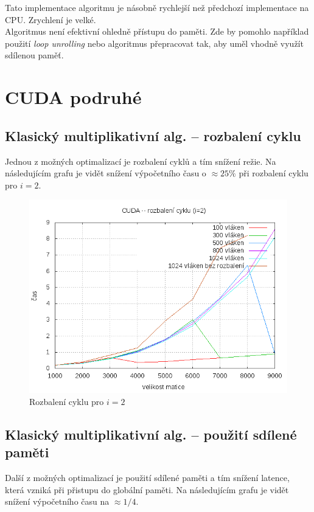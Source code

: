 \documentclass[12pt,a4paper]{article}
\begin{document}
Tato implementace algoritmu je násobně rychlejší než předchozí implementace na CPU. Zrychlení je velké. \\

Algoritmus není efektivní ohledně přístupu do paměti. Zde by pomohlo například použití \textit{loop unrolling} nebo algoritmus přepracovat tak, aby uměl vhodně využít sdílenou paměť.

\pagebreak
\section{CUDA podruhé}

\subsection{Klasický multiplikativní alg. -- rozbalení cyklu}
Jednou z možných optimalizací je rozbalení cyklů a tím snížení režie. Na následujícím grafu je vidět snížení výpočetního času o $\approx 25\%$ při rozbalení cyklu pro $i=2$.

\begin{figure}[h]
\includegraphics[width=\textwidth]{graph/cuda2/unroll/cuda-unroll.png}
\caption{Rozbalení cyklu pro $i=2$}
\label{cuda-rozbaleni}
\end{figure}

\pagebreak
\subsection{Klasický multiplikativní alg. -- použití sdílené paměti}
Další z možných optimalizací je použití sdílené paměti a tím snížení latence, která vzniká při přistupu do globální paměti. Na následujícím grafu je vidět snížení výpočetního času na $\approx 1/4$.
\end{document}
